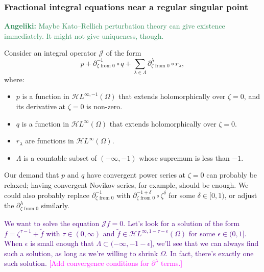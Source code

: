 \documentclass{article}
\theoremstyle{plain}
\newcommand{\holoL}[1]{\mathcal{H}L^{#1}} %
\begin{document}
\subsubsection{Fractional integral equations near a regular singular point}
\textcolor{SeaGreen}{\textbf{Angeliki:} Maybe Kato--Rellich perturbation theory can give existence immediately. It might not give uniqueness, though.}

Consider an integral operator $\mathcal{J}$ of the form
\[ p + \partial^{-1}_{\zeta \text{ from } 0} \circ q + \sum_{\lambda \in \Lambda} \partial^\lambda_{\zeta \text{ from } 0} \circ r_\lambda, \]
where:
\begin{itemize}
\item $p$ is a function in $\holoL{\infty, -1}(\Omega)$ that extends holomorphically over $\zeta = 0$, and its derivative at $\zeta = 0$ is non-zero.
\item $q$ is a function in $\holoL{\infty}(\Omega)$ that extends holomorphically over $\zeta = 0$.
\item $r_\lambda$ are functions in $\holoL{\infty}(\Omega)$.
\item $\Lambda$ is a countable subset of $(-\infty, -1)$ whose supremum is less than $-1$.
\end{itemize}
Our demand that $p$ and $q$ have convergent power series at $\zeta = 0$ can probably be relaxed; having convergent Novikov series, for example, should be enough. We could also probably replace $\partial^{-1}_{\zeta \text{ from } 0}$ with $\partial^{-1+\delta}_{\zeta \text{ from } 0} \circ \zeta^\delta$ for some $\delta \in [0, 1)$, or adjust the $\partial^\lambda_{\zeta \text{ from } 0}$ similarly.

\textcolor{Indigo}{We want to solve the equation $\mathcal{J}f = 0$. Let's look for a solution of the form $f = \zeta^{\tau-1} + \tilde{f}$ with $\tau \in (0, \infty)$ and $\tilde{f} \in \holoL{\infty, 1-\tau-\epsilon}(\Omega)$ for some $\epsilon \in (0, 1]$. When $\epsilon$ is small enough that $\Lambda \subset (-\infty, -1 - \epsilon]$, we'll see that we can always find such a solution, as long as we're willing to shrink $\Omega$. In fact, there's exactly one such solution. \textcolor{magenta}{[Add convergence conditions for $\partial^\lambda$ terms.]}}
\end{document}
